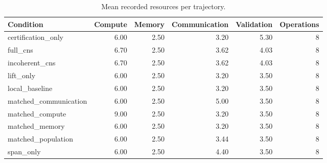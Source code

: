 \begin{table}[p]
\centering
\caption{Mean recorded resources per trajectory.}\label{tab:resources}
\small
\begin{tabular}{lrrrrr}
\toprule Condition & Compute & Memory & Communication & Validation & Operations \\ \midrule
certification\_only & 6.00 & 2.50 & 3.20 & 5.30 & 8 \\
full\_cns & 6.70 & 2.50 & 3.62 & 4.03 & 8 \\
incoherent\_cns & 6.70 & 2.50 & 3.62 & 4.03 & 8 \\
lift\_only & 6.00 & 2.50 & 3.20 & 3.50 & 8 \\
local\_baseline & 6.00 & 2.50 & 3.20 & 3.50 & 8 \\
matched\_communication & 6.00 & 2.50 & 5.00 & 3.50 & 8 \\
matched\_compute & 9.00 & 2.50 & 3.20 & 3.50 & 8 \\
matched\_memory & 6.00 & 2.50 & 3.20 & 3.50 & 8 \\
matched\_population & 6.00 & 2.50 & 3.44 & 3.50 & 8 \\
span\_only & 6.00 & 2.50 & 4.40 & 3.50 & 8 \\
\bottomrule
\end{tabular}
\end{table}

